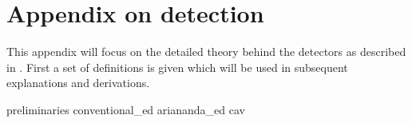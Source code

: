\documentclass[a4paper, openany, twoside]{memoir}
\begin{document}
\chapter{Appendix on detection}\label{app:detector}
This appendix will focus on the detailed theory behind the detectors as described in . First a set of definitions is given which will be
used in subsequent explanations and derivations.

{preliminaries}
{conventional_ed}
{ariananda_ed}
{cav}
\end{document}

